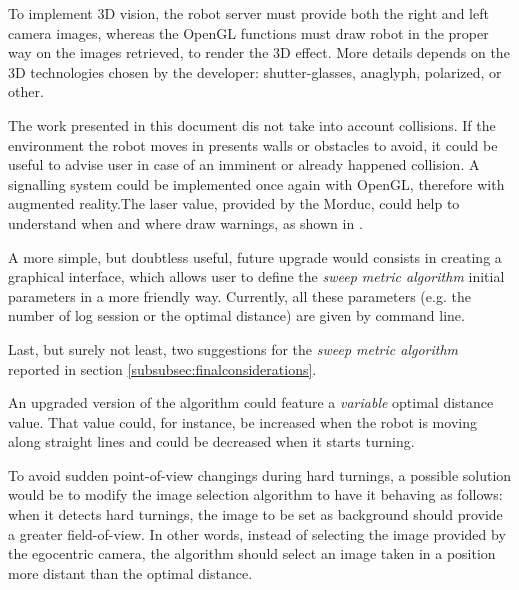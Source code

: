 %
To implement 3D vision, the robot server must provide both the right and left camera images,
whereas the OpenGL functions must draw robot in the proper way on the images retrieved, to render
the 3D effect. More details depends on the 3D technologies chosen by the developer: shutter-glasses,
anaglyph, polarized, or other.
%

%
The work presented in this document dis not take into account 
collisions. If the environment the robot moves in presents walls 
or obstacles to avoid, it could be useful to advise user in case 
of an imminent or already happened collision.
%
A signalling system could be implemented once again with OpenGL, therefore 
with augmented reality.The laser value, provided by the Morduc,
could help to understand when and where draw warnings, as shown in 
\cite{morduc:macalusodetommaso}.
%

%
A more simple, but doubtless useful, future upgrade would consists in 
creating a graphical interface, which allows user to define the
\textit{sweep metric algorithm} initial parameters in a more friendly way. 
%
Currently, all these parameters (e.g. the number of log session or the 
optimal distance) are given by command line.
%

%
Last, but surely not least, two suggestions for the 
\textit{sweep metric algorithm} reported in section 
\ref{subsubsec:finalconsiderations}.
%

%
An upgraded version of the algorithm could feature a 
\textit{variable} optimal distance value. That value 
could, for instance, be increased when the robot is moving 
along straight lines and could be decreased when it starts 
turning.
%

%
To avoid sudden point-of-view changings during hard turnings, 
a possible solution would be to modify the image selection algorithm 
to have it behaving as follows: when it detects hard turnings, the 
image to be set as background should provide a greater field-of-view. 
In other words, instead of selecting the image provided by the 
egocentric camera, the algorithm should select an image taken 
in a position more distant than the optimal distance.
%
